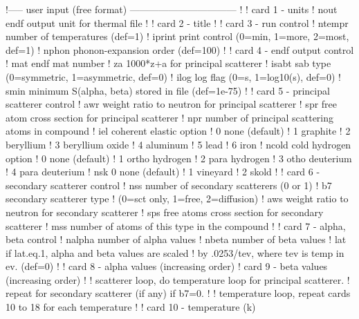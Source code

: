\small
\begin{ccode}

   !----- user input (free format) ---------------------------------
   !
   ! card 1 - units
   !    nout     endf output unit for thermal file
   !
   ! card 2 - title
   !
   ! card 3 - run control
   !    ntempr  number of temperatures (def=1)
   !    iprint  print control (0=min, 1=more, 2=most, def=1)
   !    nphon   phonon-expansion order (def=100)
   !
   ! card 4 - endf output control
   !    mat     endf mat number
   !    za      1000*z+a for principal scatterer
   !    isabt   sab type (0=symmetric, 1=asymmetric, def=0)
   !    ilog    log flag (0=s, 1=log10(s), def=0)
   !    smin    minimum S(alpha, beta) stored in file (def=1e-75)
   !
   ! card 5 - principal scatterer control
   !    awr     weight ratio to neutron for principal scatterer
   !    spr     free atom cross section for principal scatterer
   !    npr     number of principal scattering atoms in compound
   !    iel     coherent elastic option
   !                   0  none (default)
   !                   1  graphite
   !                   2  beryllium
   !                   3  beryllium oxide
   !                   4  aluminum
   !                   5  lead
   !                   6  iron
   !    ncold   cold hydrogen option
   !                   0   none (default)
   !                   1   ortho hydrogen
   !                   2   para hydrogen
   !                   3   otho deuterium
   !                   4   para deuterium
   !    nsk            0   none (default)
   !                   1   vineyard
   !                   2   skold
   !
   ! card 6 - secondary scatterer control
   !    nss     number of secondary scatterers (0 or 1)
   !    b7      secondary scatterer type
   !             (0=sct only, 1=free, 2=diffusion)
   !    aws     weight ratio to neutron for secondary scatterer
   !    sps     free atoms cross section for secondary scatterer
   !    mss     number of atoms of this type in the compound
   !
   ! card 7 - alpha, beta control
   !    nalpha   number of alpha values
   !    nbeta    number of beta values
   !    lat      if lat.eq.1, alpha and beta values are scaled
   !               by .0253/tev, where tev is temp in ev.  (def=0)
   !
   ! card 8 - alpha values (increasing order)
   ! card 9 - beta values (increasing order)
   !
   ! scatterer loop, do temperature loop for principal scatterer.
   !         repeat for secondary scatterer (if any) if b7=0.
   !
   ! temperature loop, repeat cards 10 to 18 for each temperature
   !
   !    card 10 - temperature (k)

\end{ccode}
